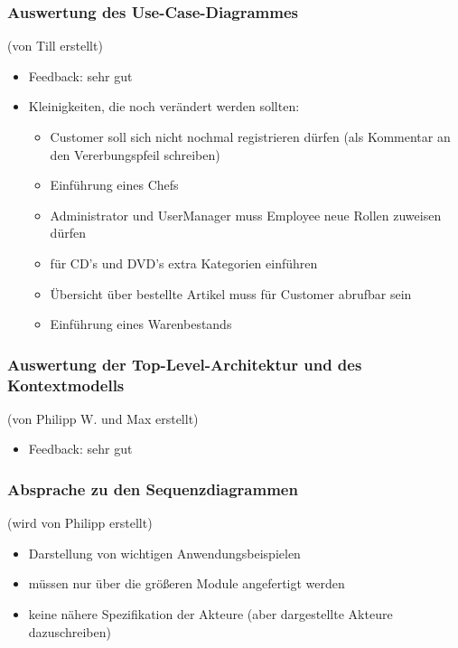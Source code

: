 \documentclass[12pt,a4paper]{article}
\begin{document}
\subsubsection*{Auswertung des Use-Case-Diagrammes}
(von Till erstellt)
\begin{itemize}
\item Feedback: sehr gut
\item Kleinigkeiten, die noch verändert werden sollten:
\begin{itemize}
\item Customer soll sich nicht nochmal registrieren dürfen (als Kommentar an den Vererbungspfeil schreiben)
\item Einführung eines Chefs
\item Administrator und UserManager muss Employee neue Rollen zuweisen dürfen
\item für CD's und DVD's extra Kategorien einführen
\item Übersicht über bestellte Artikel muss für Customer abrufbar sein
\item Einführung eines Warenbestands
\end{itemize}
\end{itemize}

\subsubsection*{Auswertung der Top-Level-Architektur und des Kontextmodells}
(von Philipp W. und Max erstellt)
\begin{itemize}
\item Feedback: sehr gut
\end{itemize}

\subsubsection*{Absprache zu den Sequenzdiagrammen}
(wird von Philipp erstellt)
\begin{itemize}
\item Darstellung von wichtigen Anwendungsbeispielen
\item müssen nur über die größeren Module angefertigt werden
\item keine nähere Spezifikation der Akteure (aber dargestellte Akteure dazuschreiben)
\end{itemize}
\end{document}
